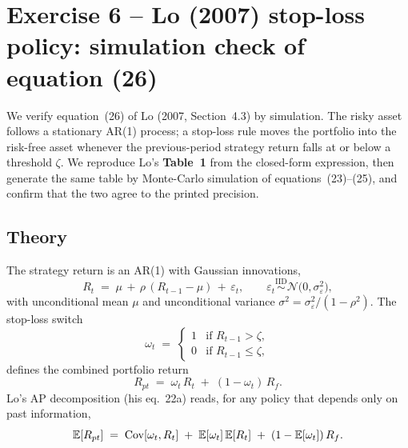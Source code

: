 \section{Exercise 6 -- Lo (2007) stop-loss policy: simulation check of
equation (26)}\label{sec:ex6}

We verify equation~(26) of Lo (2007, Section~4.3) by simulation. The
risky asset follows a stationary AR(1) process; a stop-loss rule moves the
portfolio into the risk-free asset whenever the previous-period strategy
return falls at or below a threshold $\zeta$. We reproduce Lo's
\textbf{Table~1} from the closed-form expression, then generate the same
table by Monte-Carlo simulation of equations~(23)--(25), and confirm that
the two agree to the printed precision.

\subsection{Theory}

The strategy return is an AR(1) with Gaussian innovations,
\begin{equation}\label{eq:lo23}
R_t \;=\; \mu \,+\, \rho\,(R_{t-1}-\mu) \,+\, \varepsilon_t,
\qquad \varepsilon_t \stackrel{\text{IID}}{\sim} \mathcal{N}\bigl(0,\sigma_\varepsilon^2\bigr),
\end{equation}
with unconditional mean $\mu$ and unconditional variance
$\sigma^2=\sigma_\varepsilon^2/(1-\rho^2)$. The stop-loss switch
\begin{equation}\label{eq:lo24}
\omega_t \;=\;
\begin{cases}
1 & \text{if } R_{t-1}>\zeta,\\
0 & \text{if } R_{t-1}\le\zeta,
\end{cases}
\end{equation}
defines the combined portfolio return
\begin{equation}\label{eq:lo25}
R_{pt} \;=\; \omega_t\,R_t \;+\; (1-\omega_t)\,R_f.
\end{equation}
Lo's AP decomposition (his eq.~22a) reads, for any policy that depends
only on past information,
\[
\mathbb{E}[R_{pt}] \;=\; \operatorname{Cov}[\omega_t,R_t] \;+\; \mathbb{E}[\omega_t]\,\mathbb{E}[R_t]
                 \;+\; (1-\mathbb{E}[\omega_t])\,R_f.
\]

